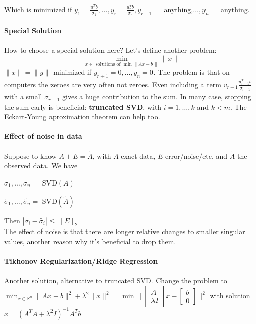 \documentclass[10pt]{report}
\begin{document}
Which is minimized if $y_1=\frac{u_1^Tb}{\sigma_1},\ldots,y_r=\frac{u_r^Tb}{\sigma_r},y_{r+1}=$ anything,$\ldots,y_n =$ anything.
\paragraph{Special Solution} How to choose a special solution here? Let's define another problem: $$\min_{x\in\text{ solutions of }\min\|Ax-b\|} \|x\|$$
$\|x\|=\|y\|$ minimized if $y_{r+1} = 0,\ldots,y_n = 0$. The problem is that on computers the zeroes are very often not zeroes. Even including a term $v_{r+1}\frac{u_{r+1}^Tb}{\sigma_{r+1}}$ with a small $\sigma_{r+1}$ gives a huge contribution to the sum. In many case, stopping the sum early is beneficial: \textbf{truncated SVD}, with $i=1,\ldots,k$ and $k<m$. The Eckart-Young aproximation theorem can help too.
\paragraph{Effect of noise in data} Suppose to know $A+E = \tilde{A}$, with $A$ exact data, $E$ error/noise/etc. and $\tilde{A}$ the observed data. We have
\begin{list}{}{}
	\item $\sigma_1,\ldots,\sigma_n =$ SVD$(A)$
	\item $\tilde{\sigma_1},\ldots,\tilde{\sigma_n} =$ SVD$(\tilde{A})$
\end{list}
Then $|\sigma_i - \tilde{\sigma_i}| \leq \|E\|_2$\\
The effect of noise is that there are longer relative changes to smaller singular values, another reason why it's beneficial to drop them.
\paragraph{Tikhonov Regularization/Ridge Regression} Another solution, alternative to truncated SVD. Change the problem to $\min_{x\in \mathbb{R}^n} \|Ax-b\|^2 + \lambda^2\|x\|^2 = \min\|\left[\begin{array}{c}
A\\\lambda I
\end{array}\right]x - \left[\begin{array}{c}
b\\0
\end{array}\right]\|^2$ with solution $x = (A^TA+\lambda^2 I)^{-1}A^Tb$
\end{document}
